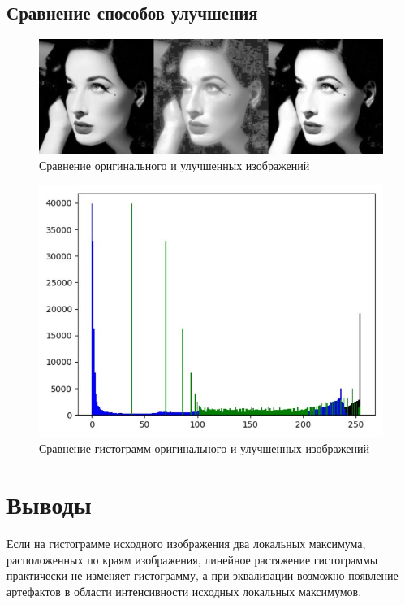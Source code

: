 \subsection{Сравнение способов улучшения}
\begin{figure}[H]
	\begin{center}
		\includegraphics[scale=0.3]{rez3.jpg}
		\caption{Сравнение оригинального и улучшенных изображений} 
		\label{pic:hist_eq} %
	\end{center}
\end{figure}
\begin{figure}[H]
	\begin{center}
		\includegraphics[scale=0.7]{hisl_last_art.JPG}
		\caption{Сравнение гистограмм оригинального и улучшенных изображений} 
		\label{pic:hist_eq} %
	\end{center}
\end{figure}

\section{Выводы}
Если на гистограмме исходного изображения два локальных максимума, расположенных по краям изображения, линейное растяжение гистограммы практически не изменяет гистограмму, а при эквализации возможно появление артефактов в области интенсивности исходных локальных максимумов.

